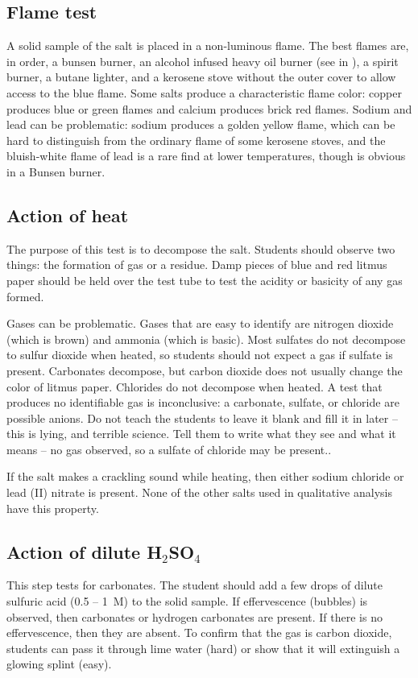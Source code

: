 \subsection{Flame test}
A solid sample of the salt is placed in a non-luminous flame. 
The best flames are, 
in order, 
a bunsen burner, 
an alcohol infused heavy oil burner 
(see  in ), 
a spirit burner, 
a butane lighter, 
and a kerosene stove without the outer cover 
to allow access to the blue flame. 
Some salts produce a characteristic flame color: 
copper produces blue or green flames and calcium produces brick red flames. 
Sodium and lead can be problematic: sodium produces a golden yellow flame, 
which can be hard to distinguish 
from the ordinary flame of some kerosene stoves, 
and the bluish-white flame of lead is a rare find at lower temperatures, 
though is obvious in a Bunsen burner.

\subsection{Action of heat}
The purpose of this test is to decompose the salt. 
Students should observe two things: the formation of gas or a residue. 
Damp pieces of blue and red litmus paper should be held 
over the test tube to test the acidity or basicity of any gas formed.

Gases can be problematic. 
Gases that are easy to identify are nitrogen dioxide 
(which is brown) and ammonia (which is basic). 
Most sulfates do not decompose to sulfur dioxide when heated, 
so students should not expect a gas if sulfate is present. 
Carbonates decompose, 
but carbon dioxide does not usually change the color of litmus paper. 
Chlorides do not decompose when heated. 
A test that produces no identifiable gas is inconclusive: a carbonate, 
sulfate, 
or chloride are possible anions. 
Do not teach the students to leave it blank and fill it in later – 
this is lying, 
and terrible science. 
Tell them to write what they see and what it means – no gas observed, 
so a sulfate of chloride may be present..

If the salt makes a crackling sound while heating, 
then either sodium chloride or lead (II) nitrate is present. 
None of the other salts used in qualitative analysis have this property.

\subsection{Action of dilute H$_{2}$SO$_{4}$}
This step tests for carbonates. 
The student should add a few drops of dilute sulfuric acid 
(0.5 -- 1~M) to the solid sample. 
If effervescence (bubbles) is observed, 
then carbonates or hydrogen carbonates are present. 
If there is no effervescence, 
then they are absent. 
To confirm that the gas is carbon dioxide, 
students can pass it through lime water 
(hard) or show that it will extinguish a glowing splint (easy).

